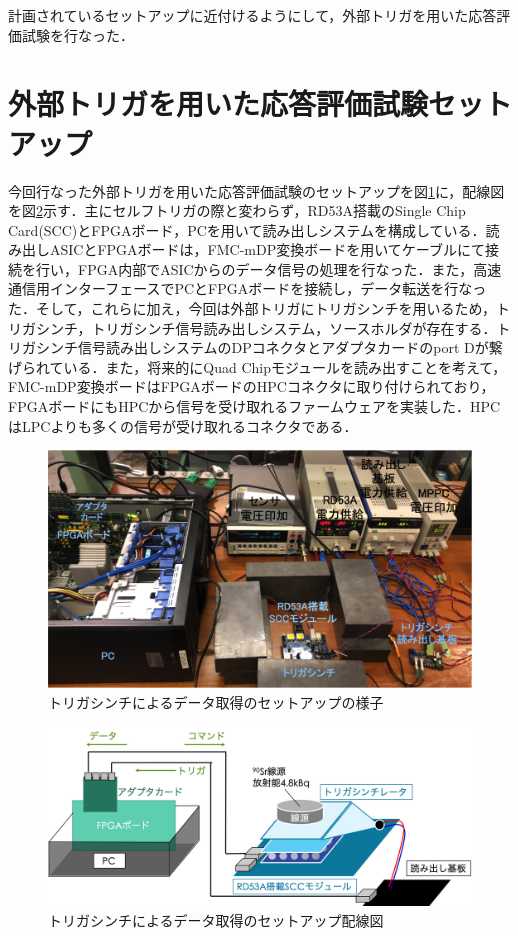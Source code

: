 計画されているセットアップに近付けるようにして，外部トリガを用いた応答評価試験を行なった．

\section{外部トリガを用いた応答評価試験セットアップ}
\label{sec:extsetup}
今回行なった外部トリガを用いた応答評価試験のセットアップを図\ref{fig:extsetup}に，配線図を図\ref{fig:extsetupcab}示す．主にセルフトリガの際と変わらず，RD53A搭載のSingle Chip Card(SCC)とFPGAボード，PCを用いて読み出しシステムを構成している．読み出しASICとFPGAボードは，FMC-mDP変換ボードを用いてケーブルにて接続を行い，FPGA内部でASICからのデータ信号の処理を行なった．また，高速通信用インターフェースでPCとFPGAボードを接続し，データ転送を行なった．そして，これらに加え，今回は外部トリガにトリガシンチを用いるため，トリガシンチ，トリガシンチ信号読み出しシステム，ソースホルダが存在する．トリガシンチ信号読み出しシステムのDPコネクタとアダプタカードのport Dが繋げられている．また，将来的にQuad Chipモジュールを読み出すことを考えて，FMC-mDP変換ボードはFPGAボードのHPCコネクタに取り付けられており，FPGAボードにもHPCから信号を受け取れるファームウェアを実装した．HPCはLPCよりも多くの信号が受け取れるコネクタである．\par

\begin{figure}[h]
  \centering
  \includegraphics[width=15cm]{./figure/extsetup.png}
  \caption{トリガシンチによるデータ取得のセットアップの様子}
  \label{fig:extsetup}
\end{figure}

\begin{figure}[h]
  \centering
  \includegraphics[width=15cm]{./figure/extsetupcab.png}
  \caption{トリガシンチによるデータ取得のセットアップ配線図}
  \label{fig:extsetupcab}
\end{figure}

